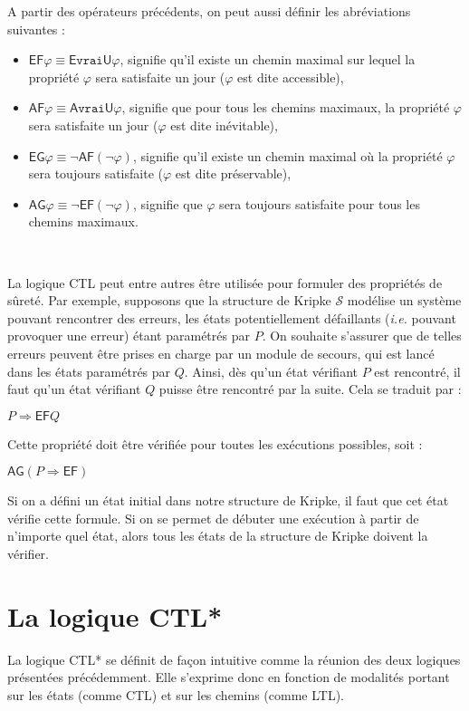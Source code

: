 A partir des opérateurs précédents, on peut aussi définir les abréviations suivantes :
\begin{itemize}
  \item $\mathsf{EF} \varphi \equiv \mathsf{E} \texttt{vrai} \mathsf{U} \varphi$, signifie qu'il existe un chemin maximal sur lequel la propriété $\varphi$ sera satisfaite un jour ($\varphi$ est dite accessible),
  \item $\mathsf{AF} \varphi \equiv \mathsf{A} \texttt{vrai} \mathsf{U} \varphi$, signifie que pour tous les chemins maximaux, la propriété $\varphi$ sera satisfaite un jour ($\varphi$ est dite inévitable),
  \item $\mathsf{EG} \varphi \equiv \neg \mathsf{AF} (\neg \varphi)$, signifie qu'il existe un chemin maximal où la propriété $\varphi$ sera toujours satisfaite ($\varphi$ est dite préservable),
  \item $\mathsf{AG} \varphi \equiv \neg \mathsf{EF} (\neg \varphi)$, signifie que $\varphi$ sera toujours satisfaite pour tous les chemins maximaux.
\end{itemize}~

La logique CTL peut entre autres être utilisée pour formuler des propriétés de sûreté. Par exemple, supposons que la structure de Kripke $\mathcal{S}$ modélise un système pouvant rencontrer des erreurs, les états potentiellement défaillants (\textit{i.e.} pouvant provoquer une erreur) étant paramétrés par $P$. On souhaite s'assurer que de telles erreurs peuvent être prises en charge par un module de secours, qui est lancé dans les états paramétrés par $Q$. Ainsi, dès qu'un état vérifiant $P$ est rencontré, il faut qu'un état vérifiant $Q$ puisse être rencontré par la suite. Cela se traduit par :
\begin{listesanspuce}
  \item $P \Rightarrow \mathsf{EF}Q$
\end{listesanspuce}
Cette propriété doit être vérifiée pour toutes les exécutions possibles, soit :
\begin{listesanspuce}
  \item $\mathsf{AG}(P \Rightarrow \mathsf{EF})$
\end{listesanspuce}

Si on a défini un état initial dans notre structure de Kripke, il faut que cet état vérifie cette formule. Si on se permet de débuter une exécution à partir de n'importe quel état, alors tous les états de la structure de Kripke doivent la vérifier.

\section{La logique CTL*}
La logique CTL* se définit de façon intuitive comme la \og réunion \fg{} des deux logiques présentées précédemment. Elle s'exprime donc en fonction de modalités portant sur les états (comme CTL) et sur les chemins (comme LTL).

